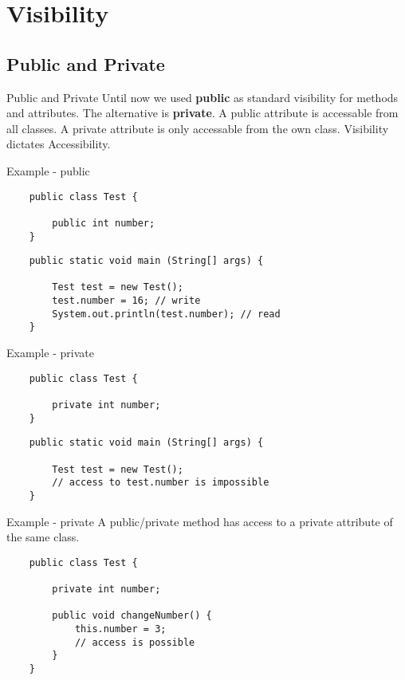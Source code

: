 
\section{Visibility}
\subsection{Public and Private}
\begin{frame}{Public and Private}
	Until now we used \textbf{public} as standard visibility for methods and attributes. 
	The alternative is \textbf{private}.
	\vfill	
	A public attribute is accessable from all classes.
	\vfill
	A private attribute is only accessable from the own class.
	\vfill
	Visibility dictates Accessibility.
\end{frame}

\begin{frame}[fragile]{Example - public}
	\begin{lstlisting}
	public class Test {
	
	    public int number;
	}
	\end{lstlisting}
	\begin{lstlisting}
	public static void main (String[] args) {
	
	    Test test = new Test();
	    test.number = 16; // write
	    System.out.println(test.number); // read
	}
	\end{lstlisting}
\end{frame}

\begin{frame}[fragile]{Example - private}
	\begin{lstlisting}
	public class Test {
	
	    private int number;
	}
	\end{lstlisting}
	\begin{lstlisting}
	public static void main (String[] args) {
	
	    Test test = new Test();
	    // access to test.number is impossible
	}
	\end{lstlisting}
\end{frame}

\begin{frame}[fragile]{Example - private}
	A public/private method has access to a private attribute of the same class.
	\begin{lstlisting}
	public class Test {
	
	    private int number;
	    
	    public void changeNumber() {
	        this.number = 3; 
	        // access is possible
	    }
	}
	\end{lstlisting}
\end{frame}

